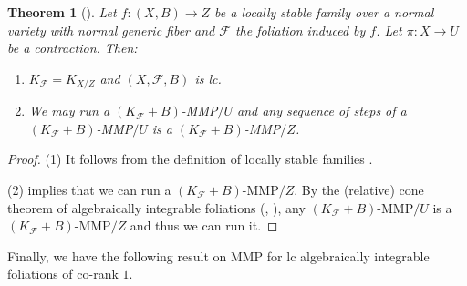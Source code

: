 \documentclass[11pt]{amsart}
\numberwithin{equation}{section}
\newcommand{\Ff}{\mathcal{F}}
\newtheorem{thm}{Theorem}[section]
\theoremstyle{definition}
\theoremstyle{definition}
\theoremstyle{definition}
\begin{document}
\begin{thm}[{\cite[Theorem 1.5]{MZ23}}]\label{thm: mmp locally stable variation}
    Let $f: (X,B)\rightarrow Z$ be a locally stable family over a normal variety with normal generic fiber and $\Ff$ the foliation induced by $f$. Let $\pi: X\rightarrow U$ be a contraction. Then:
    \begin{enumerate}
        \item $K_{\Ff}=K_{X/Z}$ and $(X,\Ff,B)$ is lc.
        \item We may run a $(K_{\Ff}+B)$-MMP$/U$ and any sequence of steps of a $(K_{\Ff}+B)$-MMP$/U$ is a $(K_{\Ff}+B)$-MMP$/Z$.
    \end{enumerate}
\end{thm}
\begin{proof}
    (1) It follows from the definition of locally stable families \cite[Theorem-Definition 4.7]{Kol23}.
    
    (2) \cite[Theorem 1.5]{MZ23} implies that we can run a $(K_{\Ff}+B)$-MMP$/Z$. By the (relative) cone theorem of algebraically integrable foliations (\cite[Theorem 2.3.1]{CHLX23}, \cite[Theorem 3.9]{ACSS21}), any $(K_{\Ff}+B)$-MMP$/U$ is a $(K_{\Ff}+B)$-MMP$/Z$ and thus we can run it. 
\end{proof}
Finally, we have the following result on MMP for lc algebraically integrable foliations of co-rank $1$.
\end{document}
